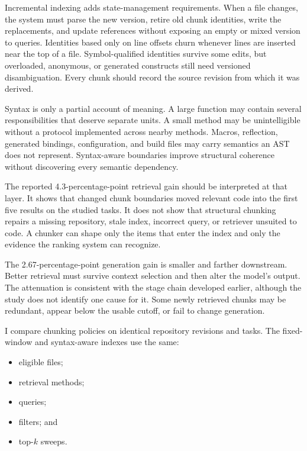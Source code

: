Incremental indexing adds state-management requirements. When a file changes, the system must parse the new version, retire old chunk identities, write the replacements, and update references without exposing an empty or mixed version to queries. Identities based only on line offsets churn whenever lines are inserted near the top of a file. Symbol-qualified identities survive some edits, but overloaded, anonymous, or generated constructs still need versioned disambiguation. Every chunk should record the source revision from which it was derived.

Syntax is only a partial account of meaning. A large function may contain several responsibilities that deserve separate units. A small method may be unintelligible without a protocol implemented across nearby methods. Macros, reflection, generated bindings, configuration, and build files may carry semantics an AST does not represent. Syntax-aware boundaries improve structural coherence without discovering every semantic dependency.

The reported 4.3-percentage-point retrieval gain should be interpreted at that layer. It shows that changed chunk boundaries moved relevant code into the first five results on the studied tasks. It does not show that structural chunking repairs a missing repository, stale index, incorrect query, or retriever unsuited to code. A chunker can shape only the items that enter the index and only the evidence the ranking system can recognize.

The 2.67-percentage-point generation gain is smaller and farther downstream. Better retrieval must survive context selection and then alter the model's output. The attenuation is consistent with the stage chain developed earlier, although the study does not identify one cause for it. Some newly retrieved chunks may be redundant, appear below the usable cutoff, or fail to change generation.


I compare chunking policies on identical repository revisions and tasks. The fixed-window and syntax-aware indexes use the same:

\begin{itemize}
\tightlist
\item
  eligible files;
\item
  retrieval methods;
\item
  queries;
\item
  filters; and
\item
  top-\(k\) sweeps.
\end{itemize}

